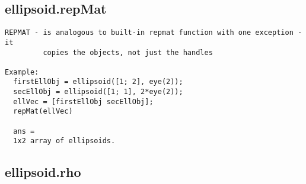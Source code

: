 \subsection{\texorpdfstring{ellipsoid.repMat}{repMat}}\label{method:ellipsoid.repMat}
\begin{verbatim}
REPMAT - is analogous to built-in repmat function with one exception - it
         copies the objects, not just the handles

Example:
  firstEllObj = ellipsoid([1; 2], eye(2));
  secEllObj = ellipsoid([1; 1], 2*eye(2));
  ellVec = [firstEllObj secEllObj];
  repMat(ellVec)

  ans =
  1x2 array of ellipsoids.
\end{verbatim}
\subsection{\texorpdfstring{ellipsoid.rho}{rho}}\label{method:ellipsoid.rho}

